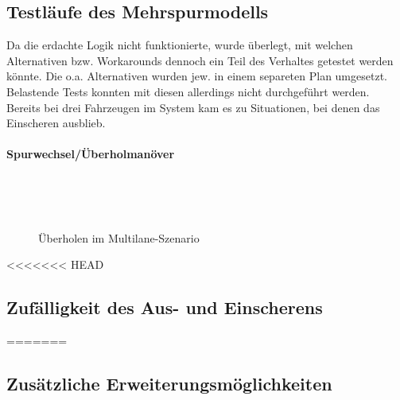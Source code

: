 


\subsection{Testläufe des Mehrspurmodells}
\label{test-multilane}

Da die erdachte Logik nicht funktionierte, wurde überlegt, mit welchen Alternativen bzw. Workarounds dennoch ein Teil des Verhaltes getestet werden könnte.
Die o.a. Alternativen wurden jew. in einem separeten Plan umgesetzt.
Belastende Tests konnten mit diesen allerdings nicht durchgeführt werden.
\\
Bereits bei drei Fahrzeugen im System kam es zu Situationen, bei denen das Einscheren ausblieb.

\paragraph*{Spurwechsel/Überholmanöver}
\hfill \\
\begin{figure}[hptb]
  \centering 
   \qquad 
    \\ 
  \caption{Überholen im Multilane-Szenario} 
  \label{figure:multi-overtake}
\end{figure}






<<<<<<< HEAD
\subsection{Zufälligkeit des Aus- und Einscherens}
=======
\subsection{Zusätzliche Erweiterungsmöglichkeiten}
\label{sec:additional-extensions}



